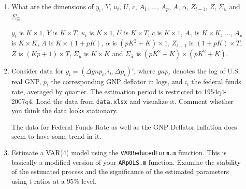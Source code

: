 \begin{enumerate}
    \item What are the dimensions of $y_t$, $Y$, $u_t$, $U$, $c$, $A_1$, ..., $A_p$, $A$, $\alpha$, $Z_{t-1}$, $Z$, $\Sigma_u$ and $\Sigma_{\hat{\alpha}}$.
          \begin{solution}
              $y_t$ is $K \times 1$, $Y$ is $K \times T$, $u_t$ is $K \times 1$, $U$ is $K \times T$, $c$ is $K \times 1$, $A_1$ is $K \times K$, ..., $A_p$ is $K \times K$, $A$ is $K \times (1+pK)$, $\alpha$ is $(pK^2+K) \times 1$, $Z_{t-1}$ is $(1+pK) \times T$, $Z$ is $(Kp+1) \times T$, $\Sigma_u$ is $K \times K$ and $\Sigma_{\hat{\alpha}}$ is $(pK^2+K) \times (pK^2+K)$.
          \end{solution}
    \item Consider data for $y_t = (\Delta gnp_t,i_t,\Delta p_t)'$, where $gnp_t$ denotes the log of U.S. real GNP, $p_t$ the corresponding GNP deflator in logs, and $i_t$ the federal funds rate, averaged by quarter. The estimation period is restricted to 1954q4-2007q4. Load the data from  \texttt{data.xlsx} and visualize it. Comment whether you think the data looks stationary.
          \begin{solution}
              The data for Federal Funds Rate as well as the GNP Deflator Inflation does seem to have some trend in it.
          \end{solution}
    \item Estimate a VAR(4) model using the \texttt{VARReducedForm.m} function. This is basically a modified version of your \texttt{ARpOLS.m} function. Examine the stability of the estimated process and the significance of the estimated parameters using t-ratios at a $95\%$ level.
          \begin{solution}
              
          \end{solution}
\end{enumerate}
